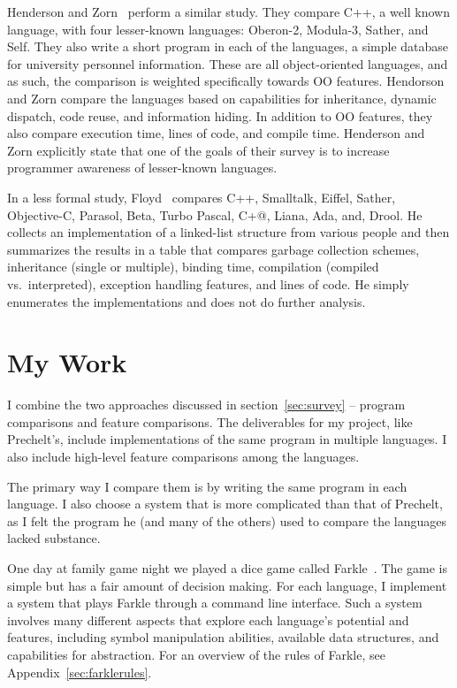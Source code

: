 \documentclass{article}
\begin{document}
Henderson and Zorn~\cite{Henderson4OOLangComp} perform a similar study.  They
compare C++, a well known language, with four lesser-known languages: Oberon-2,
Modula-3, Sather, and Self.  They also write a short program in each of the
languages, a simple database for university personnel information.  These are
all object-oriented languages, and as such, the comparison is weighted
specifically towards OO features.  Hendorson and Zorn compare the languages
based on capabilities for inheritance, dynamic dispatch, code reuse, and
information hiding.  In addition to OO features, they also compare execution
time, lines of code, and compile time.  Henderson and Zorn explicitly state
that one of the goals of their survey is to increase programmer awareness of
lesser-known languages.

In a less formal study, Floyd~\cite{DDJFloydeCompOOLangs} compares C++,
Smalltalk, Eiffel, Sather, Objective-C, Parasol, Beta, Turbo Pascal, C+@,
Liana, Ada, and, Drool.  He collects an implementation of a linked-list
structure from various people and then summarizes the results in a table that
compares garbage collection schemes, inheritance (single or multiple), binding
time, compilation (compiled vs.~interpreted), exception handling features, and
lines of code.  He simply enumerates the implementations and does not do
further analysis.

\section{My Work}

I combine the two approaches discussed in section~\ref{sec:survey} -- program
comparisons and feature comparisons.  The deliverables for my project, like
Prechelt's, include implementations of the same program in multiple languages. I
also include high-level feature comparisons among the languages.

The primary way I compare them is by writing the same program in each
language.  I also choose a system that is more complicated than that of Prechelt,
as I felt the program he (and many of the others) used to compare the languages
lacked substance.

One day at family game night we played a dice game called
Farkle~\cite{farklewikipedia}.  The game is simple but has a fair amount of
decision making.  For each language, I implement a system that plays Farkle
through a command line interface.  Such a system involves many different
aspects that explore each language's potential and features, including symbol
manipulation abilities, available data structures, and capabilities for
abstraction.  For an overview of the rules of Farkle, see
Appendix~\ref{sec:farklerules}.
\end{document}
